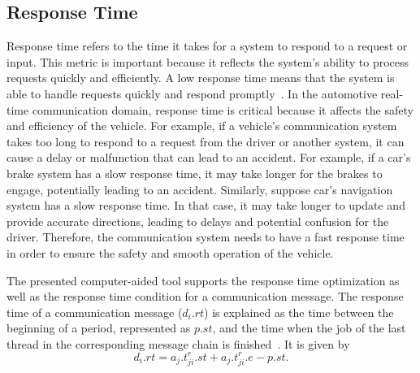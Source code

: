 
    \subsection{Response Time}
    
    Response time refers to the time it takes for a system to respond to a request or input. This metric is important because it reflects the system's ability to process requests quickly and efficiently. A low response time means that the system is able to handle requests quickly and respond promptly~\cite{zhang2014task}. In the automotive real-time communication domain, response time is critical because it affects the safety and efficiency of the vehicle. For example, if a vehicle's communication system takes too long to respond to a request from the driver or another system, it can cause a delay or malfunction that can lead to an accident. For example, if a car's brake system has a slow response time, it may take longer for the brakes to engage, potentially leading to an accident. Similarly, suppose car's navigation system has a slow response time. In that case, it may take longer to update and provide accurate directions, leading to delays and potential confusion for the driver. Therefore, the communication system needs to have a fast response time in order to ensure the safety and smooth operation of the vehicle.
    
    The presented computer-aided tool supports the response time optimization as well as the response time condition for a communication message.
    The response time of a communication message ($d_i.rt$) is explained as the time between the beginning of a period, represented as $p.st$, and the time when the job of the last thread in the corresponding message chain is finished~\cite{askaripoor2023designer}. It is given by\newline
    \begin{equation}
        d_i.rt = a_j.t_{ji}^{r}.st + a_j.t_{ji}^{r}.e - p.st.
    	\label{eq18}
    \end{equation}\newline
    

